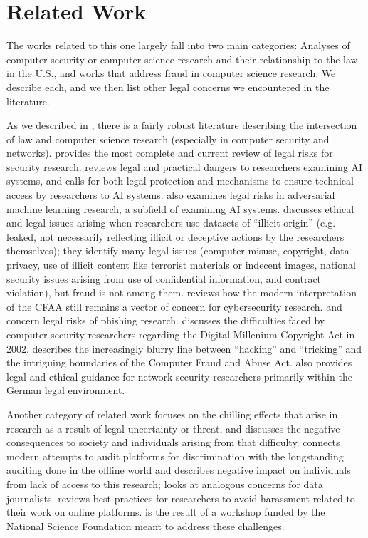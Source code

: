 \section{Related Work}
\label{sec:related_work}


The works related to this one largely fall into two main categories: Analyses of computer security or computer science research and their relationship to the law in the U.S., and works that address fraud in computer science research.  We describe each, and we then list other legal concerns we encountered in the literature.

As we described in , there is a fairly robust literature describing the intersection of law and computer science research (especially in computer security and networks).
\cite{parkResearchersGuideLegal} provides the most complete and current review of legal risks for security research.
\cite{longpre_safe_2024} reviews legal and practical dangers to researchers examining AI systems, and calls for both legal protection and mechanisms to ensure technical access by researchers to AI systems.  \cite{kumarLegalRisksAdversarial} also examines legal risks in adversarial machine learning research, a subfield of examining AI systems.
\cite{thomasEthicalIssuesResearch2017} discusses ethical and legal issues arising when researchers use datasets of ``illicit origin'' (e.g. leaked, not necessarily reflecting illicit or deceptive actions by the researchers themselves); they identify many legal issues (computer misuse, copyright, data privacy, use of illicit content like terrorist materials or indecent images, national security issues arising from use of confidential information, and contract violation), but fraud is not among them.
\cite{pfefferkorn2022} reviews how the modern interpretation of the CFAA still remains a vector of concern for cybersecurity research.
\cite{phishing-book} and \cite{soghoian2008legal} concern legal risks of phishing research.
\cite{feltenDigitalMillenniumCopyright2002} discusses the difficulties faced by computer security researchers regarding the Digital Millenium Copyright Act in 2002.
\cite{calo2018} describes the increasingly blurry line between ``hacking'' and ``tricking'' and the intriguing boundaries of the Computer Fraud and Abuse Act.
\cite{hantkeWhereAreRed2024} also provides legal and ethical guidance for network security researchers primarily within the German legal environment.


Another category of related work focuses on the chilling effects that arise in research as a result of legal uncertainty or threat, and discusses the negative consequences to society and individuals arising from that difficulty.
\cite{bhandari2024} connects modern attempts to audit platforms for discrimination with the longstanding auditing done in the offline world and describes negative impact on individuals from lack of access to this research; \cite{baranetsky2018} looks at analogous concerns for data journalists.
\cite{marwick2016} reviews best practices for researchers to avoid harassment related to their work on online platforms.
\cite{mulligan_cybersecurity_2015} is the result of a workshop funded by the National Science Foundation meant to address these challenges.

